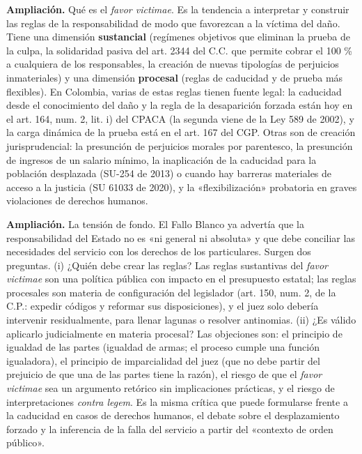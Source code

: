 \begin{ampliacion}
\textcolor[HTML]{5B3F8C}{\textbf{Ampliación. }}Qué es el \textit{favor victimae}. Es la tendencia a interpretar y construir las reglas de la responsabilidad de modo que favorezcan a la víctima del daño. Tiene una dimensión \textbf{sustancial} (regímenes objetivos que eliminan la prueba de la culpa, la solidaridad pasiva del art. 2344 del C.C. que permite cobrar el 100 \% a cualquiera de los responsables, la creación de nuevas tipologías de perjuicios inmateriales) y una dimensión \textbf{procesal} (reglas de caducidad y de prueba más flexibles). En Colombia, varias de estas reglas tienen fuente legal: la caducidad desde el conocimiento del daño y la regla de la desaparición forzada están hoy en el art. 164, num. 2, lit. i) del CPACA (la segunda viene de la Ley 589 de 2002), y la carga dinámica de la prueba está en el art. 167 del CGP. Otras son de creación jurisprudencial: la presunción de perjuicios morales por parentesco, la presunción de ingresos de un salario mínimo, la inaplicación de la caducidad para la población desplazada (SU-254 de 2013) o cuando hay barreras materiales de acceso a la justicia (SU 61033 de 2020), y la «flexibilización» probatoria en graves violaciones de derechos humanos.
\par
\textcolor[HTML]{5B3F8C}{\textbf{Ampliación. }}La tensión de fondo. El Fallo Blanco ya advertía que la responsabilidad del Estado no es «ni general ni absoluta» y que debe conciliar las necesidades del servicio con los derechos de los particulares. Surgen dos preguntas. (i) ¿Quién debe crear las reglas? Las reglas sustantivas del \textit{favor victimae} son una política pública con impacto en el presupuesto estatal; las reglas procesales son materia de configuración del legislador (art. 150, num. 2, de la C.P.: expedir códigos y reformar sus disposiciones), y el juez solo debería intervenir residualmente, para llenar lagunas o resolver antinomias. (ii) ¿Es válido aplicarlo judicialmente en materia procesal? Las objeciones son: el principio de igualdad de las partes (igualdad de armas; el proceso cumple una función igualadora), el principio de imparcialidad del juez (que no debe partir del prejuicio de que una de las partes tiene la razón), el riesgo de que el \textit{favor victimae} sea un argumento retórico sin implicaciones prácticas, y el riesgo de interpretaciones \textit{contra legem}. Es la misma crítica que puede formularse frente a la caducidad en casos de derechos humanos, el debate sobre el desplazamiento forzado y la inferencia de la falla del servicio a partir del «contexto de orden público».
\end{ampliacion}

